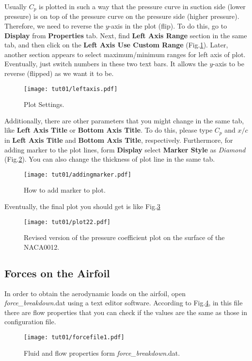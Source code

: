 Usually $C_p$ is plotted in such a way that the pressure curve in suction side (lower pressure) is on top of the pressure curve on the pressure side (higher pressure). Therefore, we need to reverse  the $y$-axis in the plot (flip). To do this, go to \textbf{Display} from \textbf{Properties} tab. Next, find \textbf{Left Axis Range} section in the same tab, and then click on the \textbf{Left Axis Use Custom Range} (Fig.\ref{fig1:viewsetting}). Later, another section appears to select maximum/minimum ranges for left axis of plot. Eventually, just switch numbers in these two text bars. It allows the $y$-axis to be reverse (flipped) as we want it to be.
\begin{figure}[htbp]
    \centering
    \texttt{[image: tut01/leftaxis.pdf]}
    \caption{Plot Settings.}
    \label{fig1:viewsetting}
\end{figure}
Additionally, there are other parameters that you might change in the same tab, like \textbf{Left Axis Title} or  \textbf{Bottom Axis Title}. To do this, please type $C_p$ and $x/c$ in \textbf{Left Axis Title} and \textbf{Bottom Axis Title}, respectively. Furthermore, for adding marker to the plot lines, form \textbf{Display} select \textbf{Marker Style} as \textit{Diamond} (Fig.\ref{fig1:marker}). You can also change the thickness of plot line in the same tab.
\begin{figure}[htbp]
    \centering
    \texttt{[image: tut01/addingmarker.pdf]}
    \caption{How to add marker to plot.}
    \label{fig1:marker}
\end{figure}
Eventually, the final plot you should get is like Fig.\ref{fig1:surface_pressure2}
\begin{figure}[htbp]
    \centering
    \texttt{[image: tut01/plot22.pdf]}
    \caption{Revised version of the pressure coefficient plot on the surface of the NACA0012.}
    \label{fig1:surface_pressure2}
\end{figure}
\subsection{Forces on the Airfoil}
In order to obtain the aerodynamic loads on the airfoil, open \textit{force\_breakdown}.dat using a text editor software. According to Fig.\ref{fig1:forcefile1}, in this file there are flow properties that you can check if the values are the same as those in configuration file. 
\begin{figure}[htbp]
    \centering
    \texttt{[image: tut01/forcefile1.pdf]}
    \caption{Fluid and flow properties form \textit{force\_breakdown}.dat.}
    \label{fig1:forcefile1}
\end{figure}

